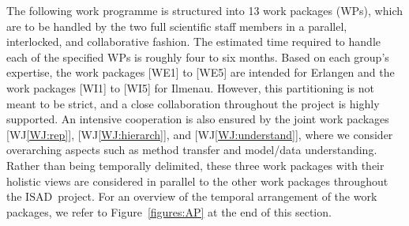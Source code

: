 \documentclass[11pt,a4paper]{article}
\def\PN{\mathrm{ISAD}}
\newcommand{\meinard}[1]{{\color{red} #1}}
\theoremstyle{plain} \newtheorem{define}{Definition}[section]
\begin{document}
{The following work programme is structured into 13 work packages (WPs), which are to be handled by the two full scientific staff members in a parallel, interlocked, and collaborative fashion. The estimated time required to handle each of the specified WPs is roughly four to six months.
%
Based on each group's expertise, the work packages [WE1] to [WE5] are intended for Erlangen and the work packages [WI1] to [WI5] for Ilmenau. However, this partitioning is not meant to be strict, and a close collaboration throughout the project is highly supported. 
%
An intensive cooperation is also ensured by the joint work packages [WJ\ref{WJ:rep}], [WJ\ref{WJ:hierarch}], and [WJ\ref{WJ:understand}], where we consider overarching aspects such as method transfer and model/data understanding. Rather than being temporally delimited, these three work packages with their holistic views are considered in parallel to the other work packages throughout the $\PN$~project.
%
For an overview of the temporal arrangement of the work packages, we refer to Figure~\ref{figures:AP} at the end of this section.
%


}
\end{document}

